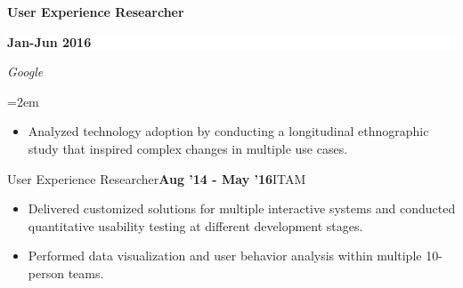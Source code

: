 \documentclass[paper=letter,fontsize=10.4pt]{scrartcl} %
\newcommand{\EducationEntry}[5]{
		\noindent \textbf{#1} \hfill      %
		\colorbox{White}{%
			\parbox{10em}{%
            \hfill\color{Black}#2}} \par  %
		\noindent \textit{#3} \par        %
		\noindent\hangindent=2em\hangafter=0 \small #4 %
		\normalsize \par}
\begin{document}
\EducationEntry{User Experience Researcher}{\textbf{Jan-Jun 2016}}{Google}{
\begin{itemize}
	\item Analyzed technology adoption by conducting a longitudinal ethnographic study that inspired complex changes in multiple use cases.
\end{itemize}
}

\EducationEntry{User Experience Researcher}{\textbf{Aug '14 - May '16}}{ITAM}{
\begin{itemize}
\setlength\itemsep{0.05em}
    \item Delivered customized solutions for multiple interactive systems and conducted quantitative usability testing at different development stages.
    \item Performed data visualization and user behavior analysis within multiple 10-person teams.
\end{itemize}
}



\end{document}
